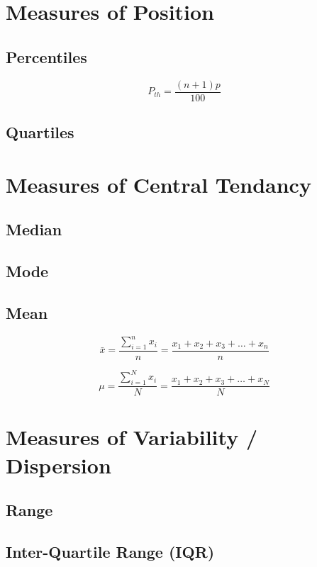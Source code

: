 \documentclass[12pt,a4paper]{article}
\begin{document}
\section{Measures of Position}

\subsection{Percentiles}
\begin{equation}
    P_{th} = \frac{(n+1)p}{100}
\end{equation}
\subsection{Quartiles}


\section{Measures of Central Tendancy}

\subsection{Median}
\subsection{Mode}
\subsection{Mean}

\begin{equation}
    \bar{x} = \frac{\sum_{i = 1}^{n} x_i}{n}= \frac{x_1 + x_2 + x_3 + \ldots + x_n}{n}
\end{equation}

\begin{equation}
    \mu = \frac{\sum_{i = 1}^{N} x_i}{N}= \frac{x_1 + x_2 + x_3 + \ldots + x_N}{N}
\end{equation}


\section{Measures of Variability / Dispersion}

\subsection{Range}
\subsection{Inter-Quartile Range (IQR)}
\end{document}
